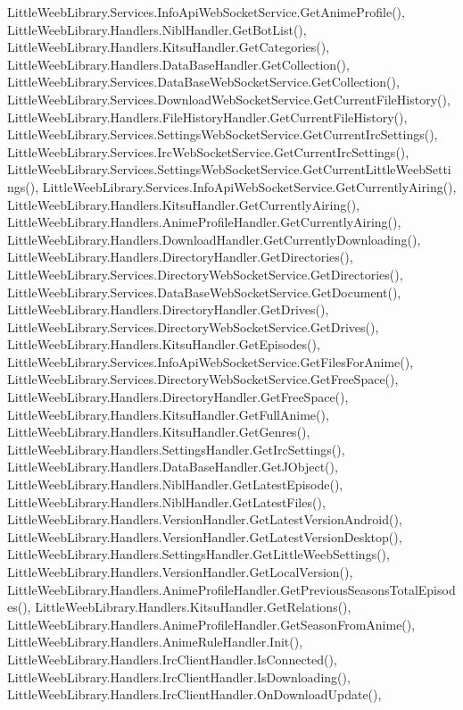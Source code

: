 Little\+Weeb\+Library.\+Services.\+Info\+Api\+Web\+Socket\+Service.\+Get\+Anime\+Profile(), Little\+Weeb\+Library.\+Handlers.\+Nibl\+Handler.\+Get\+Bot\+List(), Little\+Weeb\+Library.\+Handlers.\+Kitsu\+Handler.\+Get\+Categories(), Little\+Weeb\+Library.\+Handlers.\+Data\+Base\+Handler.\+Get\+Collection(), Little\+Weeb\+Library.\+Services.\+Data\+Base\+Web\+Socket\+Service.\+Get\+Collection(), Little\+Weeb\+Library.\+Services.\+Download\+Web\+Socket\+Service.\+Get\+Current\+File\+History(), Little\+Weeb\+Library.\+Handlers.\+File\+History\+Handler.\+Get\+Current\+File\+History(), Little\+Weeb\+Library.\+Services.\+Settings\+Web\+Socket\+Service.\+Get\+Current\+Irc\+Settings(), Little\+Weeb\+Library.\+Services.\+Irc\+Web\+Socket\+Service.\+Get\+Current\+Irc\+Settings(), Little\+Weeb\+Library.\+Services.\+Settings\+Web\+Socket\+Service.\+Get\+Current\+Little\+Weeb\+Settings(), Little\+Weeb\+Library.\+Services.\+Info\+Api\+Web\+Socket\+Service.\+Get\+Currently\+Airing(), Little\+Weeb\+Library.\+Handlers.\+Kitsu\+Handler.\+Get\+Currently\+Airing(), Little\+Weeb\+Library.\+Handlers.\+Anime\+Profile\+Handler.\+Get\+Currently\+Airing(), Little\+Weeb\+Library.\+Handlers.\+Download\+Handler.\+Get\+Currently\+Downloading(), Little\+Weeb\+Library.\+Handlers.\+Directory\+Handler.\+Get\+Directories(), Little\+Weeb\+Library.\+Services.\+Directory\+Web\+Socket\+Service.\+Get\+Directories(), Little\+Weeb\+Library.\+Services.\+Data\+Base\+Web\+Socket\+Service.\+Get\+Document(), Little\+Weeb\+Library.\+Handlers.\+Directory\+Handler.\+Get\+Drives(), Little\+Weeb\+Library.\+Services.\+Directory\+Web\+Socket\+Service.\+Get\+Drives(), Little\+Weeb\+Library.\+Handlers.\+Kitsu\+Handler.\+Get\+Episodes(), Little\+Weeb\+Library.\+Services.\+Info\+Api\+Web\+Socket\+Service.\+Get\+Files\+For\+Anime(), Little\+Weeb\+Library.\+Services.\+Directory\+Web\+Socket\+Service.\+Get\+Free\+Space(), Little\+Weeb\+Library.\+Handlers.\+Directory\+Handler.\+Get\+Free\+Space(), Little\+Weeb\+Library.\+Handlers.\+Kitsu\+Handler.\+Get\+Full\+Anime(), Little\+Weeb\+Library.\+Handlers.\+Kitsu\+Handler.\+Get\+Genres(), Little\+Weeb\+Library.\+Handlers.\+Settings\+Handler.\+Get\+Irc\+Settings(), Little\+Weeb\+Library.\+Handlers.\+Data\+Base\+Handler.\+Get\+J\+Object(), Little\+Weeb\+Library.\+Handlers.\+Nibl\+Handler.\+Get\+Latest\+Episode(), Little\+Weeb\+Library.\+Handlers.\+Nibl\+Handler.\+Get\+Latest\+Files(), Little\+Weeb\+Library.\+Handlers.\+Version\+Handler.\+Get\+Latest\+Version\+Android(), Little\+Weeb\+Library.\+Handlers.\+Version\+Handler.\+Get\+Latest\+Version\+Desktop(), Little\+Weeb\+Library.\+Handlers.\+Settings\+Handler.\+Get\+Little\+Weeb\+Settings(), Little\+Weeb\+Library.\+Handlers.\+Version\+Handler.\+Get\+Local\+Version(), Little\+Weeb\+Library.\+Handlers.\+Anime\+Profile\+Handler.\+Get\+Previous\+Seasons\+Total\+Episodes(), Little\+Weeb\+Library.\+Handlers.\+Kitsu\+Handler.\+Get\+Relations(), Little\+Weeb\+Library.\+Handlers.\+Anime\+Profile\+Handler.\+Get\+Season\+From\+Anime(), Little\+Weeb\+Library.\+Handlers.\+Anime\+Rule\+Handler.\+Init(), Little\+Weeb\+Library.\+Handlers.\+Irc\+Client\+Handler.\+Is\+Connected(), Little\+Weeb\+Library.\+Handlers.\+Irc\+Client\+Handler.\+Is\+Downloading(), Little\+Weeb\+Library.\+Handlers.\+Irc\+Client\+Handler.\+On\+Download\+Update(), 